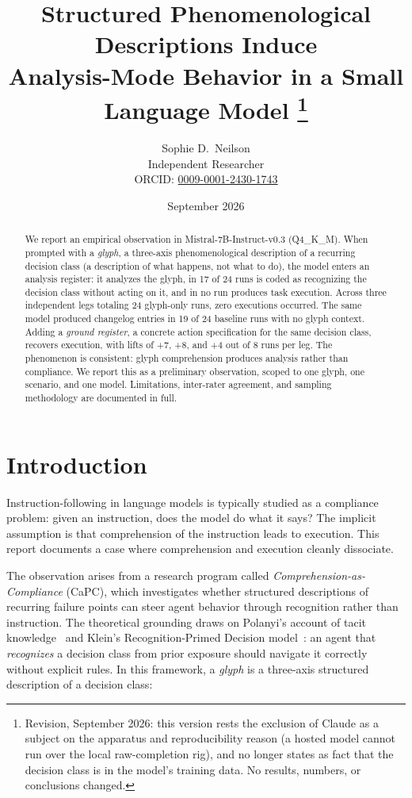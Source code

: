 \documentclass[11pt,a4paper]{article}
\title{%
  Structured Phenomenological Descriptions Induce \\
  Analysis-Mode Behavior in a Small Language Model%
  \thanks{Revision, September 2026: this version rests the exclusion of Claude as a
  subject on the apparatus and reproducibility reason (a hosted model cannot run over
  the local raw-completion rig), and no longer states as fact that the decision class
  is in the model's training data. No results, numbers, or conclusions changed.}%
}
\author{Sophie D.\ Neilson \\
  \small Independent Researcher \\
  \small ORCID: \href{https://orcid.org/0009-0001-2430-1743}{0009-0001-2430-1743}
}
\date{September 2026}
\begin{document}
\maketitle

\begin{abstract}
We report an empirical observation in Mistral-7B-Instruct-v0.3 (Q4\_K\_M).
When prompted with a \emph{glyph}, a three-axis phenomenological description
of a recurring decision class (a description of what happens, not what to do),
the model enters an analysis register: it
analyzes the glyph, in 17 of 24 runs is coded as recognizing the decision
class without acting on it, and in no run produces task execution. Across three independent legs
totaling 24 glyph-only runs, zero executions occurred. The same model produced changelog entries in 19 of 24
baseline runs with no glyph context. Adding a \emph{ground register}, a
concrete action specification for the same decision class, recovers execution,
with lifts of +7, +8, and +4 out of 8 runs per leg. The phenomenon is
consistent: glyph comprehension produces analysis rather than compliance. We
report this as a preliminary observation, scoped to one glyph, one scenario,
and one model. Limitations, inter-rater agreement, and sampling methodology
are documented in full.
\end{abstract}

\section{Introduction}

Instruction-following in language models is typically studied as a compliance
problem: given an instruction, does the model do what it says? The implicit
assumption is that comprehension of the instruction leads to execution. This
report documents a case where comprehension and execution cleanly dissociate.

The observation arises from a research program called
\emph{Comprehension-as-Compliance} (CaPC), which investigates whether
structured descriptions of recurring failure points can steer agent behavior
through recognition rather than instruction. The theoretical grounding draws on
Polanyi's account of tacit knowledge~\citep{polanyi1966} and Klein's
Recognition-Primed Decision model~\citep{klein1998}: an agent that
\emph{recognizes} a decision class from prior exposure should navigate it
correctly without explicit rules. In this framework, a \emph{glyph} is a
three-axis structured description of a decision class:
\end{document}

